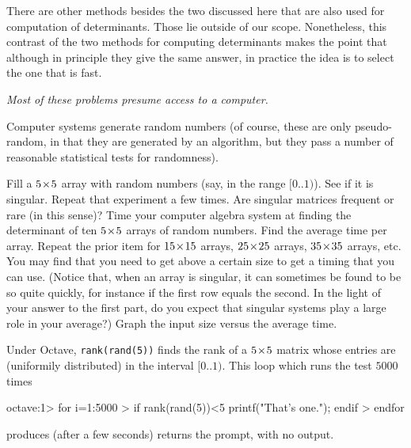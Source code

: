 There are other methods besides the two discussed here
that are also used for computation of determinants.
Those lie outside of our scope.
Nonetheless, this contrast of the two methods for computing determinants 
makes the point that although in principle they give the same answer, 
in practice the idea is to select the one that is fast.




\begin{exercises}
  \item[\textit{Most of these problems presume access to a computer.}]
  \item 
    Computer systems generate random numbers
    (of course, these are only pseudo-random, in that they are
    generated by an algorithm, but they 
    pass a number of reasonable statistical tests for randomness).
    \begin{exparts}
      \partsitem Fill a $5 \! \times \! 5$ array with random numbers (say, in the
        range $[0..1)$).
        See if it is singular.
        Repeat that experiment a few times.
        Are singular matrices frequent or rare (in this sense)?
      \partsitem Time your computer algebra system at finding the
        determinant of ten $5 \! \times \! 5$ arrays of random numbers.
        Find the average time per array.
        Repeat the prior item for $15 \! \times \! 15$ arrays,
        $25 \! \times \! 25$ arrays, $35 \! \times \! 35$ arrays, etc.
        You may find that you need to get above a certain size
        to get a timing that you can use. 
        (Notice that, when an array is singular, it can sometimes
        be found to be so quite quickly,
        for instance if the first row equals the second.
        In the light of your answer to the first part, do you expect that 
        singular systems play a large role in your average?)
      \partsitem Graph the input size versus the average time.
    \end{exparts}
    \begin{answer}
      \begin{exparts}
        \partsitem Under Octave, \texttt{rank(rand(5))} finds the
          rank of a $5 \! \times \! 5$ matrix whose entries are (uniformily
          distributed) in the interval $[0..1)$.
          This loop which runs the test $5000$ times
\begin{computercode}
octave:1> for i=1:5000
> if rank(rand(5))<5 printf("That's one."); endif
> endfor
\end{computercode}  
          produces (after a few seconds) returns the prompt, with no output.


\end{exparts}
\end{answer}
\end{exercises}
